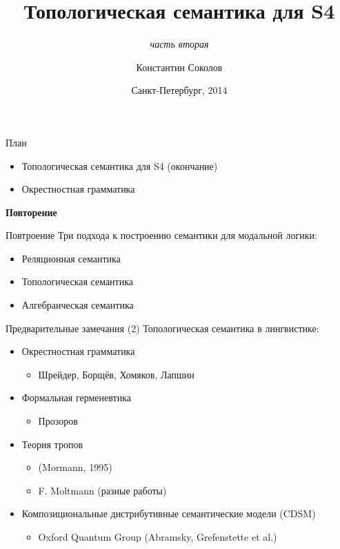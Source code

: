 \documentclass{beamer}
\begin{document}
\title{\Large{Топологическая семантика для S4}}
\subtitle{\textit{часть вторая}}
\author{Константин Соколов}
\date{Санкт-Петербург, 2014} 
\begin{frame}
    \thispagestyle{empty}
    \titlepage
\end{frame}

\begin{frame}{План}
    \setcounter{framenumber}{1}
    \begin{itemize}
        \item Топологическая семантика для S4 (окончание)
        \item Окрестностная грамматика
    \end{itemize}
\end{frame}

\begin{frame}{}
\begin{center}
	\textbf{Повторение}
\end{center}
\end{frame}

\begin{frame}{Повтроение}
Три подхода к построению семантики для модальной логики:\\
\bigskip
\begin{itemize}
	\item Реляционная семантика
	\item Топологическая семантика
	\item Алгебраическая семантика
\end{itemize}
\end{frame}

\begin{frame}{Предварительные замечания (2)}
Топологическая семантика в лингвистике:\\
\bigskip
\begin{itemize}
    \item Окрестностная грамматика
		\begin{itemize}
			\item Шрейдер, Борщёв, Хомяков, Лапшин
		\end{itemize}
    \item Формальная герменевтика
		\begin{itemize}
			\item Прозоров
		\end{itemize}
    \item Теория тропов
		\begin{itemize}
			\item (Mormann, 1995)
			\item F. Moltmann (разные работы)
		\end{itemize}
    \item Композициональные дистрибутивные семантические модели (CDSM)
		\begin{itemize}
			\item Oxford Quantum Group (Abramsky, Grefenstette et al.)
		\end{itemize}
\end{itemize}
\end{frame}
\end{document}
